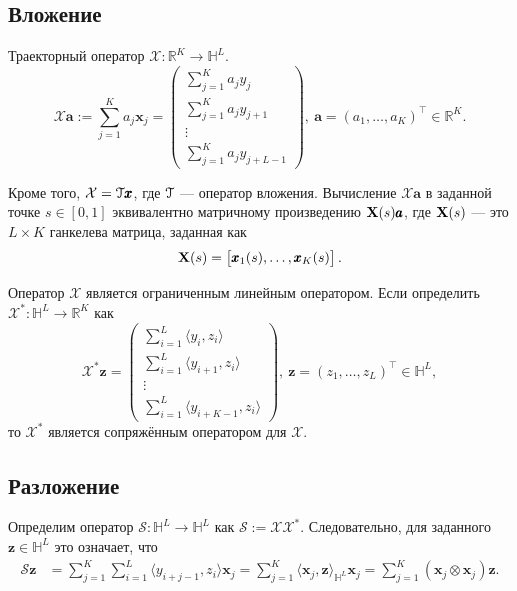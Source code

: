 \documentclass[12pt, specialist, subf
]{disser}
\theoremstyle{definition}
\begin{document}
\subsection*{Вложение}
Траекторный оператор $\mathcal{X}:\mathbb{R}^K \rightarrow \mathbb{H}^L$.
\begin{equation}
	\label{eq:traj}
	\mathcal{X}{\pmb a}:=\sum_{j=1}^K a_j{\pmb x}_j=
	\begin{pmatrix} \sum_{j=1}^K a_jy_j\\ \sum_{j=1}^K a_j y_{j+1}\\ \vdots\\ \sum_{j=1}^K a_j y_{j+L-1} \end{pmatrix},
	\ {\pmb a}=\left(a_1,\ldots, a_K\right)^\top \in\mathbb{R}^K.
\end{equation}

Кроме того, $\mathcal{X}=\EuScript{T}\pmb {x}$, где $\EuScript{T}$ — оператор вложения. Вычисление $\mathcal{X} \pmb{a}$ в заданной точке $s\in [0,1]$ эквивалентно матричному произведению ${\bf X}(s)\pmb{a}$, где ${\bf X}(s)$ — это $L \times K$ ганкелева матрица, заданная как
\begin{equation}\label{ftraj}
	{\bf X}(s)=\begin{bmatrix} {\pmb x}_1(s), \ldots, {\pmb x}_K(s) \end{bmatrix}.
\end{equation}


Оператор $\mathcal{X}$ является ограниченным линейным оператором. Если определить $\mathcal{X}^*:\mathbb{H}^L \rightarrow \mathbb{R}^K$ как
\begin{equation}
	\mathcal{X}^*{\pmb z}=
	\begin{pmatrix} \sum_{i=1}^L \langle y_i, z_i\rangle\\ \sum_{i=1}^L \langle y_{i+1}, z_i\rangle\\ \vdots\\ \sum_{i=1}^L \langle y_{i+K-1}, z_i\rangle \end{pmatrix},
	\ {\pmb z}=\left(z_1,\ldots, z_L\right)^\top\in\mathbb{H}^L,
\end{equation}
то $\mathcal{X}^*$ является сопряжённым оператором для $\mathcal{X}$.

\subsection*{Разложение}
Определим оператор $\mathcal{S}: \mathbb{H}^L\rightarrow \mathbb{H}^L$ как $\mathcal{S}:=\mathcal{X}\mathcal{X}^*$. Следовательно, для заданного ${\pmb z}\in \mathbb{H}^{L}$ это означает, что
\begin{align}\label{eq: s-operator}
	\mathcal{S}{\pmb z} &
	=\sum_{j=1}^K\sum_{i=1}^L \langle y_{i+j-1} , z_i \rangle {\pmb x}_j
	=\sum_{j=1}^K \langle {\pmb x}_j , {\pmb z} \rangle_{\mathbb{H}^L} {\pmb x}_j
	=\sum_{j=1}^K ({\pmb x}_j \otimes {\pmb x}_j) {\pmb z}.
\end{align}
\end{document}
